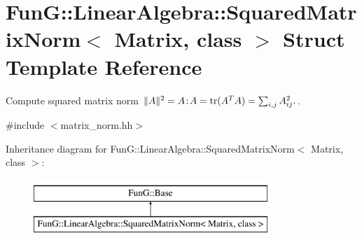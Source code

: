 \hypertarget{structFunG_1_1LinearAlgebra_1_1SquaredMatrixNorm}{\section{Fun\-G\-:\-:Linear\-Algebra\-:\-:Squared\-Matrix\-Norm$<$ Matrix, class $>$ Struct Template Reference}
\label{structFunG_1_1LinearAlgebra_1_1SquaredMatrixNorm}
}


Compute squared matrix norm $ \|A\|^2 = A\negthinspace : \negthinspace A = \mathrm{tr}(A^TA) = \sum_{i,j} A_{ij}^2. $.  




{\ttfamily \#include $<$matrix\-\_\-norm.\-hh$>$}

Inheritance diagram for Fun\-G\-:\-:Linear\-Algebra\-:\-:Squared\-Matrix\-Norm$<$ Matrix, class $>$\-:\begin{figure}[H]
\begin{center}
\leavevmode
\includegraphics[height=2.000000cm]{structFunG_1_1LinearAlgebra_1_1SquaredMatrixNorm}
\end{center}
\end{figure}
